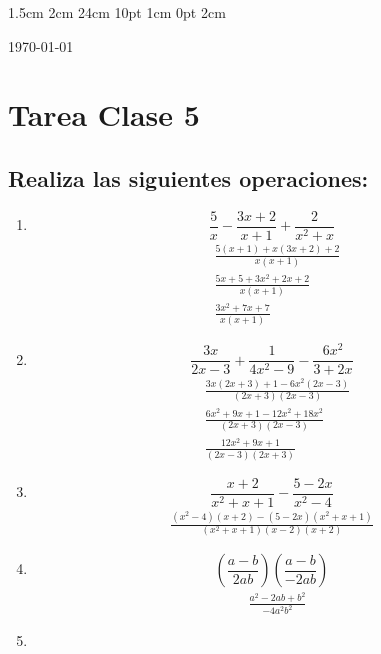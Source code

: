 \documentclass[12pt,letterpaper]{report}
\begin{document}
\setmargins{2.5cm}      
{1.5cm}                     
{2cm}  
{24cm}                    
{10pt}                          
{1cm}                          
{0pt}                             
{2cm}
\begin{flushright}
\today
\end{flushright}
\vspace{-1.75cm}
\section*{Tarea Clase 5}
\subsection*{Realiza las siguientes operaciones:}
\begin{enumerate}
\item \begin{equation*}
\frac{5}{x}-\frac{3x+2}{x+1}+\frac{2}{x^2+x}
\end{equation*}
\begin{align*}
    &\frac{5(x+1)+x(3x+2)+2}{x(x+1)}\\
    &\frac{5x+5+3x^2+2x+2}{x(x+1)}\\
    &\frac{3x^2+7x+7}{x(x+1)}
\end{align*}
\item \begin{equation*}
\frac{3x}{2x-3}+\frac{1}{4x^2-9}-\frac{6x^2}{3+2x}
\end{equation*}
\begin{align*}
    &\frac{3x(2x+3)+1-6x^2(2x-3)}{(2x+3)(2x-3)}\\
    &\frac{6x^2+9x+1-12x^2+18x^2}{(2x+3)(2x-3)}\\
    &\frac{12x^2+9x+1}{(2x-3)(2x+3)}
\end{align*}
\item \begin{equation*}
\frac{x+2}{x^2+x+1}-\frac{5-2x}{x^2-4}
\end{equation*}
\begin{align*}
    \frac{(x^2-4)(x+2)-(5-2x)(x^2+x+1)}{(x^2+x+1)(x-2)(x+2)}
\end{align*}
\item \begin{equation*}
    \left(\frac{a-b}{2ab}\right) \left(\frac{a-b}{-2ab} \right)
\end{equation*}
\begin{align*}
    &\frac{a^2-2ab+b^2}{-4a^2b^2}
\end{align*}
\item \begin{equation*}

\end{equation*}
\end{enumerate}
\end{document}
